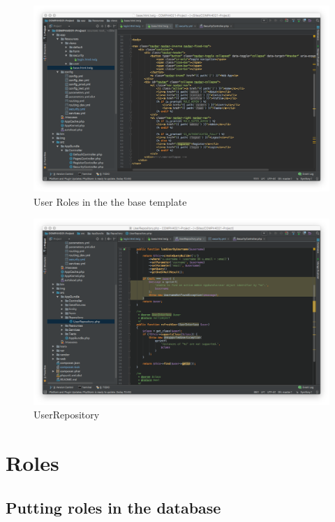 \begin{figure}[htbp]
   \centering
   \includegraphics[width=400pt]{figures/base_html_twig.png} %
   \caption{User Roles in the the base template}
   \label{fig:User Roles in the the base template}
\end{figure}

\begin{figure}[htbp]
   \centering
   \includegraphics[width=400pt]{figures/user_repository.png} %
   \caption{UserRepository}
   \label{fig:UserRepository}
\end{figure}

\section{Roles}

\subsection{Putting roles in the database}

